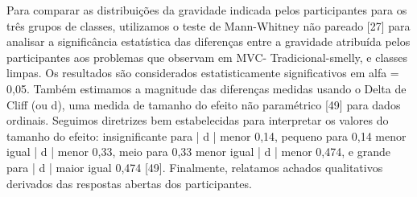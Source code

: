 Para comparar as distribuições da gravidade indicada pelos participantes para os três grupos de classes, utilizamos o teste de Mann-Whitney não pareado [27] para analisar a significância estatística das diferenças entre a gravidade atribuída pelos participantes aos problemas que observam em MVC- Tradicional-smelly, e classes limpas. Os resultados são considerados estatisticamente significativos em alfa = 0,05. Também estimamos a magnitude das diferenças medidas usando o Delta de Cliff (ou d), uma medida de tamanho do efeito não paramétrico [49] para dados ordinais. Seguimos diretrizes bem estabelecidas para interpretar os valores do tamanho do efeito: insignificante para | d | menor 0,14, pequeno para 0,14 menor igual | d | menor 0,33, meio para 0,33 menor igual | d | menor 0,474, e grande para | d | maior igual 0,474 [49]. Finalmente, relatamos achados qualitativos derivados das respostas abertas dos participantes.

















